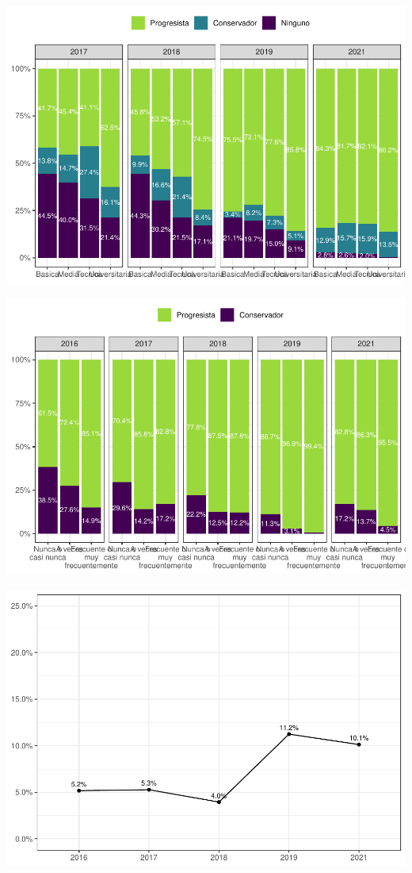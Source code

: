 \documentclass[
  12pt,
]{book}
\begin{document}
\begin{center}\includegraphics{reporte-elsoc_files/figure-latex/unnamed-chunk-11-1} \end{center}

\begin{center}\includegraphics{reporte-elsoc_files/figure-latex/unnamed-chunk-12-1} \end{center}

\begin{center}\includegraphics{reporte-elsoc_files/figure-latex/unnamed-chunk-13-1} \end{center}
\end{document}
